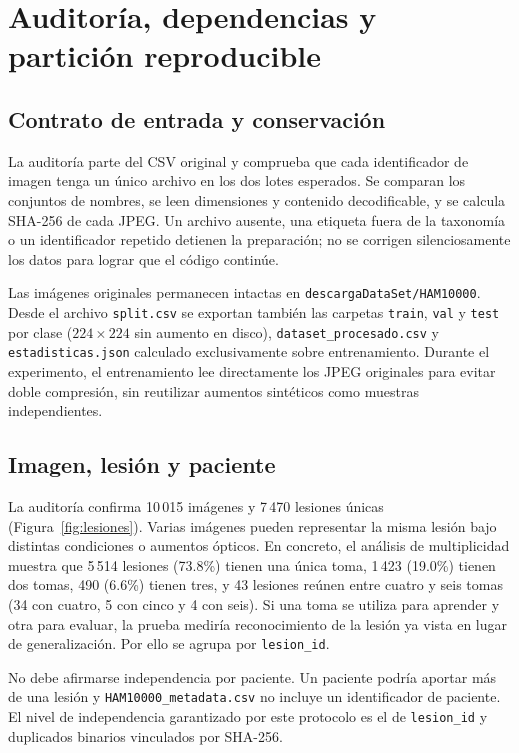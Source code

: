 \FloatBarrier\section{Auditoría, dependencias y partición reproducible}

\subsection{Contrato de entrada y conservación}
La auditoría parte del CSV original y comprueba que cada identificador de imagen tenga un único archivo en los dos lotes esperados. Se comparan los conjuntos de nombres, se leen dimensiones y contenido decodificable, y se calcula SHA-256 de cada JPEG. Un archivo ausente, una etiqueta fuera de la taxonomía o un identificador repetido detienen la preparación; no se corrigen silenciosamente los datos para lograr que el código continúe.

Las imágenes originales permanecen intactas en \texttt{descargaDataSet/HAM10000}. Desde el archivo \texttt{split.csv} se exportan también las carpetas \texttt{train}, \texttt{val} y \texttt{test} por clase ($224\times224$ sin aumento en disco), \texttt{dataset\_procesado.csv} y \texttt{estadisticas.json} calculado exclusivamente sobre entrenamiento. Durante el experimento, el entrenamiento lee directamente los JPEG originales para evitar doble compresión, sin reutilizar aumentos sintéticos como muestras independientes.

\subsection{Imagen, lesión y paciente}
La auditoría confirma 10\,015 imágenes y 7\,470 lesiones únicas (Figura~\ref{fig:lesiones}). Varias imágenes pueden representar la misma lesión bajo distintas condiciones o aumentos ópticos. En concreto, el análisis de multiplicidad muestra que 5\,514 lesiones (73.8\%) tienen una única toma, 1\,423 (19.0\%) tienen dos tomas, 490 (6.6\%) tienen tres, y 43 lesiones reúnen entre cuatro y seis tomas (34 con cuatro, 5 con cinco y 4 con seis). Si una toma se utiliza para aprender y otra para evaluar, la prueba mediría reconocimiento de la lesión ya vista en lugar de generalización. Por ello se agrupa por \texttt{lesion\_id}.

\begin{tcolorbox}[notaBox,title={Alcance de la independencia garantizada}]
No debe afirmarse independencia por paciente. Un paciente podría aportar más de una lesión y \texttt{HAM10000\_metadata.csv} no incluye un identificador de paciente. El nivel de independencia garantizado por este protocolo es el de \texttt{lesion\_id} y duplicados binarios vinculados por SHA-256.
\end{tcolorbox}

